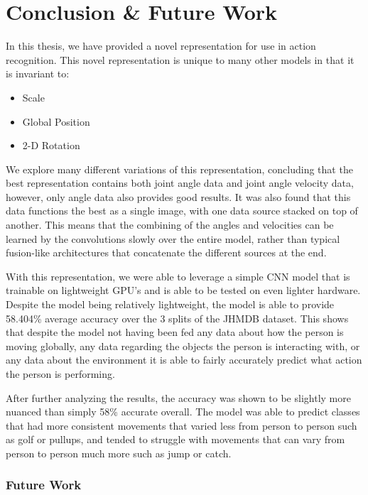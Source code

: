 
\chapter{Conclusion \& Future Work} %

\label{Conclusion}

In this thesis, we have provided a novel representation for use in action recognition. This novel representation is unique to many other models in that it is invariant to:

\begin{itemize}
	\item Scale
	\item Global Position
	\item 2-D Rotation
\end{itemize}

We explore many different variations of this representation, concluding that the best representation contains both joint angle data and joint angle velocity data, however, only angle data also provides good results. It was also found that this data functions the best as a single image, with one data source stacked on top of another. This means that the combining of the angles and velocities can be learned by the convolutions slowly over the entire model, rather than typical fusion-like architectures that concatenate the different sources at the end.

With this representation, we were able to leverage a simple CNN model that is trainable on lightweight GPU's and is able to be tested on even lighter hardware. Despite the model being relatively lightweight, the model is able to provide 58.404\% average accuracy over the 3 splits of the JHMDB dataset. This shows that despite the model not having been fed any data about how the person is moving globally, any data regarding the objects the person is interacting with, or any data about the environment it is able to fairly accurately predict what action the person is performing.

After further analyzing the results, the accuracy was shown to be slightly more nuanced than simply 58\% accurate overall. The model was able to predict classes that had more consistent movements that varied less from person to person such as golf or pullups, and tended to struggle with movements that can vary from person to person much more such as jump or catch.

\subsection{Future Work}


